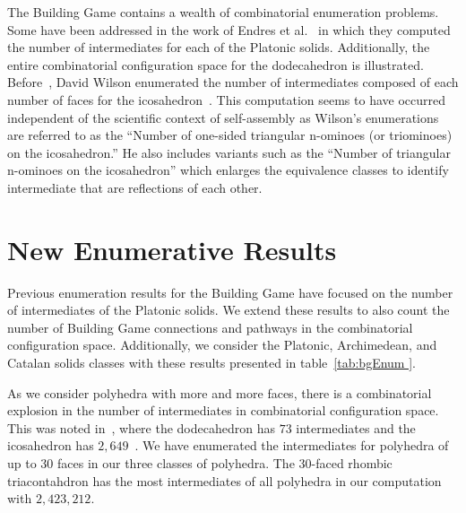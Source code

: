 
The Building Game contains a wealth of combinatorial enumeration problems. Some have been addressed in the work of Endres et al.~\cite{Endres2005} in which they computed the number of intermediates for each of the Platonic solids. Additionally, the entire combinatorial configuration space for the dodecahedron is illustrated. Before~\cite{Endres2005}, David Wilson enumerated the number of intermediates composed of each number of faces for the icosahedron~\cite{OEIS}. This computation seems to have occurred independent of the scientific context of self-assembly as Wilson's enumerations are referred to as the ``Number of one-sided triangular n-ominoes (or triominoes) on the icosahedron.'' He also includes variants such as the ``Number of triangular n-ominoes on the icosahedron'' which enlarges the equivalence classes to identify intermediate that are reflections of each other. 

\section{New Enumerative Results}

Previous enumeration results for the Building Game have focused on the number of intermediates of the Platonic solids. We extend these results to also count the number of Building Game connections and pathways in the combinatorial configuration space. Additionally, we consider the Platonic, Archimedean, and Catalan solids classes with these results presented in table~\ref{tab:bgEnum }. 

As we consider polyhedra with more and more faces, there is a combinatorial explosion in the number of intermediates in combinatorial configuration space. This was noted in~\cite{Endres2005}, where the dodecahedron has $73$ intermediates and the icosahedron has $2,649$~\cite{Endres2005}. We have enumerated the intermediates for polyhedra of up to $30$ faces in our three classes of polyhedra. The $30$-faced rhombic triacontahdron has the most intermediates of all polyhedra in our computation with $2,423,212$.



